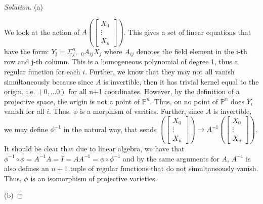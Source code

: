 \documentclass[10pt]{article}
\begin{document}
\begin{proof}[Solution]

(a)

We look at the action of $A(\begin{bmatrix} X_0 \\ \vdots \\ X_n \end{bmatrix})$. This gives a set of linear equations that have the form: $Y_i = \Sigma_{j = 0}^{n} A_{ij} X_j$ where $A_{ij}$ denotes the field element in the i-th row and j-th column. This is a homogeneous polynomial of degree 1, thus a regular function for each $i$. Further, we know that they may not all vanish simultaneously because since $A$ is invertible, then it has trivial kernel equal to the origin, i.e. $(0,...0)$ for all n+1 coordinates. However, by the definition of a projective space, the origin is not a point of $\mathbb{P}^n$. Thus, on no point of $\mathbb{P}^n$ does $Y_i$ vanish for all $i$. Thus, $\phi$ is a morphism of varities. Further, since $A$ is invertible, we may define $\phi^{-1}$ in the natural way, that sends $(\begin{bmatrix} X_0 \\ \vdots \\ X_n \end{bmatrix}) \to A^{-1}(\begin{bmatrix} X_0 \\ \vdots \\ X_n \end{bmatrix})$. It should be clear that due to linear algebra, we have that $\phi^{-1} \circ \phi = A^{-1} A = I = A A^{-1} = \phi \circ \phi^{-1}$ and by the same arguments for $A$, $A^{-1}$ is also defines an $n+1$ tuple of regular functions that do not simultaneously vanish. Thus, $\phi$ is an isomorphism of projective varieties. 
 
(b)


\end{proof}
\end{document}
